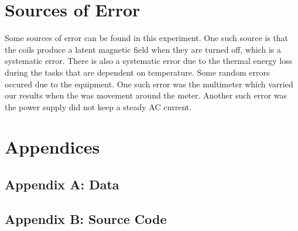 \documentclass[a4paper]{article}
\begin{document}
\section{Sources of Error}
\qq Some sources of error can be found in this experiment. One such
source is that the coils produce a latent magnetic field when they are
turned off, which is a systematic error. There is also a systematic
error due to the thermal energy loss during the tasks that are
dependent on temperature. Some random errors occured due to the
equipment. One such error was the multimeter which varried our results
when the was movement around the meter. Another such error was the
power supply did not keep a steady AC current.

\section{Appendices}

\subsection{Appendix A: Data}

\subsection{Appendix B: Source Code}
\end{document}
